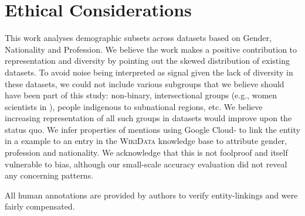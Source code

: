 \section*{Ethical Considerations}
\label{sec:ethics}

This work analyses demographic subsets across \qa{} datasets based on Gender, Nationality and Profession. 
We believe the work makes a positive contribution to representation and diversity by pointing out the skewed distribution of existing  datasets.
To avoid noise being interpreted as signal given the lack of diversity in these datasets, we could not include various subgroups that we believe should have been part of this study: non-binary, intersectional groups (e.g., women scientists in ), people indigenous to subnational regions, etc. 
We believe increasing representation of all such groups in  datasets would improve upon the status quo.
We infer properties of mentions using Google Cloud- to link the entity in a  example to an entry in the \textsc{WikiData} knowledge base to attribute gender, profession and nationality. 
We acknowledge that this is not foolproof and itself vulnerable to bias, although our small-scale accuracy evaluation did not reveal any concerning patterns.

All human annotations are provided by authors to verify entity-linkings and were fairly compensated.